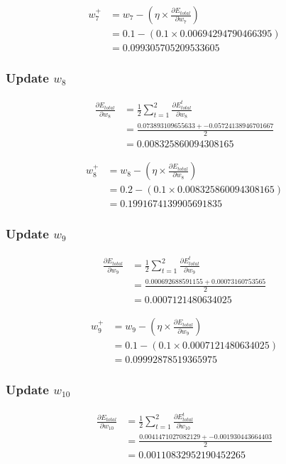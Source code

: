 \documentclass{article}
\begin{document}
\begin{align*}
    w_{7}^{+} &= w_7 - (\eta \times \frac{\partial E_{total}}{\partial w_7}) \\
    & = 0.1 - (0.1 \times 0.00694294790466395) \\
    & = 0.099305705209533605
\end{align*}
\subsubsection{Update $w_8$}
\begin{align*}
    \frac{\partial E_{total}}{\partial w_8} & =
        \frac{1}{2}
            \sum_{t=1}^{2}{
                \frac{\partial E_{total}^{t}}{\partial w_8}} \\
    & = \frac{0.073893109655633 + -0.05724138946701667}{2} \\
    & = 0.008325860094308165
\end{align*}

\begin{align*}
    w_{8}^{+} &= w_8 - (\eta \times \frac{\partial E_{total}}{\partial w_8}) \\
    & = 0.2 - (0.1 \times 0.008325860094308165) \\
    & = 0.1991674139905691835
\end{align*}
\subsubsection{Update $w_9$}
\begin{align*}
    \frac{\partial E_{total}}{\partial w_9} & =
        \frac{1}{2}
            \sum_{t=1}^{2}{
                \frac{\partial E_{total}^{t}}{\partial w_9}} \\
    & = \frac{0.000692688591155+ 0.00073160753565}{2} \\
    & = 0.0007121480634025
\end{align*}

\begin{align*}
    w_{9}^{+} &= w_9 - (\eta \times \frac{\partial E_{total}}{\partial w_9}) \\
    & = 0.1 - (0.1 \times 0.0007121480634025) \\
    & = 0.09992878519365975
\end{align*}
\subsubsection{Update $w_{10}$}
\begin{align*}
    \frac{\partial E_{total}}{\partial w_{10}} & =
        \frac{1}{2}
            \sum_{t=1}^{2}{
                \frac{\partial E_{total}^{t}}{\partial w_{10}}} \\
    & = \frac{0.0041471027082129 + -0.001930443664403}{2} \\
    & = 0.00110832952190452265
\end{align*}
\end{document}

